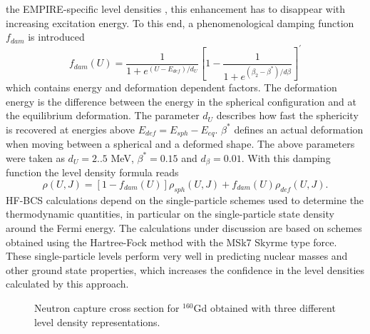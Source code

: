 the EMPIRE-specific level densities%
, this enhancement has to disappear with increasing
excitation energy. To this end, a phenomenological damping function $f_{dam}$
is introduced
\begin{equation}
f_{dam}(U)=%
\frac{1}{1+e^{(U-E_{def})/d_{U}}}\left[1-\frac{1}{1+e^{(\beta_{2}-%
\beta^{*})/d\beta}}\right]^{\prime}  \label{dampgor}
\end{equation}
which contains energy and deformation dependent factors. The deformation
energy is the difference between the energy in the spherical configuration
and at the equilibrium deformation. The parameter $d_{U}$ describes how fast
the sphericity is recovered at energies above $E_{def}=E_{sph}-E_{eq}$. $%
\beta^{*}$ defines an actual deformation when moving between a spherical and
a deformed shape. The above parameters were taken as $d_{U}=2..5$ MeV, $%
\beta^{*}=0.15$ and $d_{\beta}=0.01$. With this damping function the level
density%
 formula reads
\begin{equation}
\rho(U,J)=\left[1-f_{dam}(U)\right]\rho_{sph}(U,J)+f_{dam}(U)\rho_{def}(U,J).
\label{rogor}
\end{equation}
HF-BCS%
 calculations depend on the single-particle schemes used to
determine the thermodynamic quantities, in particular on the single-particle
state density around the Fermi energy. The calculations under discussion are
based on schemes obtained using the Hartree-Fock method with the MSk7 Skyrme
type force. These single-particle levels perform very well in predicting
nuclear masses and other ground state properties, which increases the
confidence in the level densities%
 calculated by this approach.
\begin{figure}[htbp]
\caption{Neutron capture cross section for $^{160}$Gd obtained with three
different level density representations.}
\label{levdens}
\end{figure}

